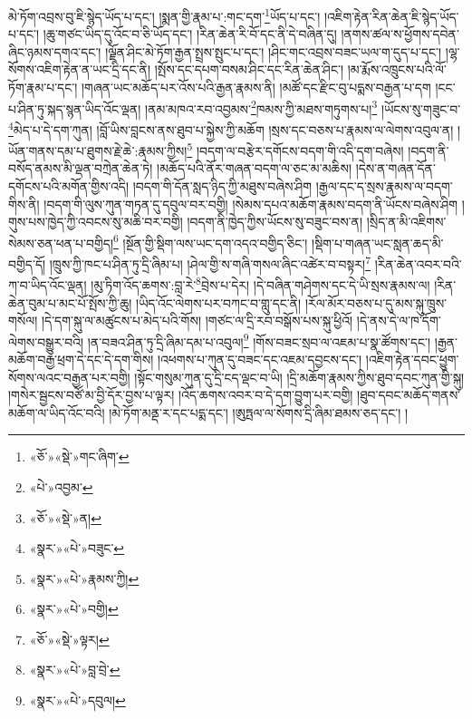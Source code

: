 མེ་ཏོག་འབྲས་བུ་ཇི་སྙེད་ཡོད་པ་དང་། །སྨན་གྱི་རྣམ་པ་:གང་དག་\footnote{«ཅོ་»«སྡེ་»གང་ཞིག་}ཡོད་པ་དང་། །འཇིག་རྟེན་རིན་ཆེན་ཇི་སྙེད་ཡོད་པ་དང་། །ཆུ་གཙང་ཡིད་དུ་འོང་བ་ཅི་ཡོད་དང་། །རིན་ཆེན་རི་བོ་དང་ནི་དེ་བཞིན་དུ། །ནགས་ཚལ་ས་ཕྱོགས་དབེན་ཞིང་ཉམས་དགའ་དང་། །ལྗོན་ཤིང་མེ་ཏོག་རྒྱན་སྤྲས་སྤུང་པ་དང་། །ཤིང་གང་འབྲས་བཟང་ཡལ་ག་དུད་པ་དང་། །ལྷ་སོགས་འཇིག་རྟེན་ན་ཡང་དྲི་དང་ནི། །སྤོས་དང་དཔག་བསམ་ཤིང་དང་རིན་ཆེན་ཤིང་། །མ་རྨོས་འཁྲུངས་པའི་ལོ་ཏོག་རྣམ་པ་དང་། །གཞན་ཡང་མཆོད་པར་འོས་པའི་རྒྱན་རྣམས་ནི། །མཚོ་དང་རྫིང་བུ་པདྨས་བརྒྱན་པ་དག །ངང་པ་ཤིན་ཏུ་སྐད་སྙན་ཡིད་འོང་ལྡན། །ནམ་མཁའ་རབ་འབྱམས་\footnote{«པེ་»འབྱམ་}ཁམས་ཀྱི་མཐས་གཏུགས་པ།\footnote{«ཅོ་»«སྡེ་»ན།} །ཡོངས་སུ་གཟུང་བ་\footnote{«སྣར་»«པེ་»བཟུང་}མེད་པ་དེ་དག་ཀུན། །བློ་ཡིས་བླངས་ནས་ཐུབ་པ་སྐྱེས་ཀྱི་མཆོག །སྲས་དང་བཅས་པ་རྣམས་ལ་ལེགས་འབུལ་ན། །ཡོན་གནས་དམ་པ་ཐུགས་རྗེ་ཆེ་:རྣམས་ཀྱིས།\footnote{«སྣར་»«པེ་»རྣམས་ཀྱི།} །བདག་ལ་བརྩེར་དགོངས་བདག་གི་འདི་དག་བཞེས། །བདག་ནི་བསོད་ནམས་མི་ལྡན་བཀྲེན་ཆེན་ཏེ། །མཆོད་པའི་ནོར་གཞན་བདག་ལ་ཅང་མ་མཆིས། །དེས་ན་གཞན་དོན་དགོངས་པའི་མགོན་གྱིས་འདི། །བདག་གི་དོན་སླད་ཉིད་ཀྱི་མཐུས་བཞེས་ཤིག །རྒྱལ་དང་ད་སྲས་རྣམས་ལ་བདག་གིས་ནི། །བདག་གི་ལུས་ཀུན་གཏན་དུ་དབུལ་བར་བགྱི། །སེམས་དཔའ་མཆོག་རྣམས་བདག་ནི་ཡོངས་བཞེས་ཤིག །གུས་པས་ཁྱེད་ཀྱི་འབངས་སུ་མཆི་བར་བགྱི། །བདག་ནི་ཁྱེད་ཀྱིས་ཡོངས་སུ་བཟུང་བས་ན། །སྲིད་ན་མི་འཇིགས་སེམས་ཅན་ཕན་པ་བགྱིད།\footnote{«སྣར་»«པེ་»བགྱི།} །སྔོན་གྱི་སྡིག་ལས་ཡང་དག་འདའ་བགྱིད་ཅིང་། །སྡིག་པ་གཞན་ཡང་སླན་ཆད་མི་བགྱིད་དོ། །ཁྲུས་ཀྱི་ཁང་པ་ཤིན་ཏུ་དྲི་ཞིམ་པ། །ཤེལ་གྱི་ས་གཞི་གསལ་ཞིང་འཚེར་བ་བསྟར།\footnote{«ཅོ་»«སྡེ་»ལྟར།} །རིན་ཆེན་འབར་བའི་ཀ་བ་ཡིད་འོང་ལྡན། །མུ་ཏིག་འོད་ཆགས་:བླ་རེ་\footnote{«སྣར་»«པེ་»བླ་བྲེ་}བྲེས་པ་དེར། །དེ་བཞིན་གཤེགས་དང་དེ་ཡི་སྲས་རྣམས་ལ། །རིན་ཆེན་བུམ་པ་མང་པོ་སྤོས་ཀྱི་ཆུ། །ཡིད་འོང་ལེགས་པར་བཀང་བ་གླུ་དང་ནི། །རོལ་མོར་བཅས་པ་དུ་མས་སྐུ་ཁྲུས་གསོལ། །དེ་དག་སྐུ་ལ་མཚུངས་པ་མེད་པའི་གོས། །གཙང་ལ་དྲི་རབ་བསྒོས་པས་སྐུ་ཕྱིའོ། །དེ་ནས་དེ་ལ་ཁ་དོག་ལེགས་བསྒྱུར་བའི། །ན་བཟའ་ཤིན་ཏུ་དྲི་ཞིམ་དམ་པ་འབུལ།\footnote{«སྣར་»«པེ་»དབུལ།} །གོས་བཟང་སྲབ་ལ་འཇམ་པ་སྣ་ཚོགས་དང་། །རྒྱན་མཆོག་བརྒྱ་ཕྲག་དེ་དང་དེ་དག་གིས། །འཕགས་པ་ཀུན་དུ་བཟང་དང་འཇམ་དབྱངས་དང་། །འཇིག་རྟེན་དབང་ཕྱུག་སོགས་ལའང་བརྒྱན་པར་བགྱི། །སྟོང་གསུམ་ཀུན་དུ་དྲི་ངད་ལྡང་བ་ཡི། །དྲི་མཆོག་རྣམས་ཀྱིས་ཐུབ་དབང་ཀུན་གྱི་སྐུ། །གསེར་སྦྱངས་བཙོ་མ་བྱི་དོར་བྱས་པ་ལྟར། །འོད་ཆགས་འབར་བ་དེ་དག་བྱུག་པར་བགྱི། །ཐུབ་དབང་མཆོད་གནས་མཆོག་ལ་ཡིད་འོང་བའི། །མེ་ཏོག་མནྡ་ར་དང་པདྨ་དང་། །ཨུཏྤལ་ལ་སོགས་དྲི་ཞིམ་ཐམས་ཅད་དང་། །
